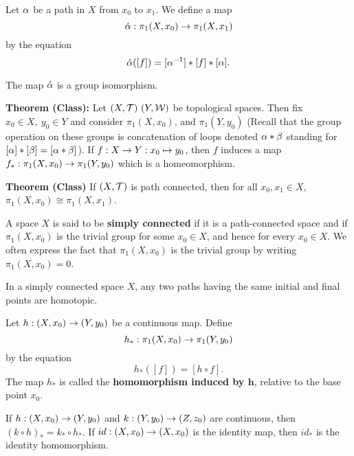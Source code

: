 \vs

\dfn Let $\alpha$ be a path in $X$ from $x_0$ to $x_1$. We define a map
\[\hat {\alpha} :\pi_1(X, x_0)\rightarrow \pi_1(X, x_1)\]
by the equation
\[\hat {\alpha}([f]) = [\alpha^{-1}]*[f]*[\alpha].\]

\vs

\begin{thm}
The map $\hat {\alpha}$ is a group isomorphism.
\end{thm}

\vs

\textbf{Theorem (Class):} Let $(X, \mathcal{T})\ (Y, \mathcal{W})$ be topological spaces. Then fix $x_0\in X,\ y_0\in Y$ and consider $\pi_1(X, x_0)$, and $\pi_1(Y, y_0)$ (Recall that the group operation on these groups is concatenation of loops denoted $\alpha * \beta$  standing for $[\alpha]*[\beta] = [\alpha*\beta]$). If $f:X\rightarrow Y:x_0 \mapsto y_0$, then $f$ induces a map $f_*:\pi_1(X,x_0) \rightarrow \pi_1(Y,y_0)$ which is a homeomorphism.

\vs 

\textbf{Theorem (Class)} If $(X, \mathcal{T})$ is path connected, then for all $x_0, x_1\in X$, $\pi_1(X, x_0)\cong \pi_1(X, x_1)$.

\vs

\dfn A space $X$ is said to be \textbf{simply connected} if it is a path-connected space and if $\pi_1(X, x_0)$ is the trivial group for some $x_0\in X$, and hence for every $x_0\in X$. We often express the fact that $\pi_1(X, x_0)$ is the trivial group by writing $\pi_1(X, x_0) = 0$.

\vs

\begin{lem}
In a simply connected space $X$, any two paths having the same initial and final points are homotopic.
\end{lem}

\vs

\dfn Let $h:(X, x_0) \rightarrow (Y, y_0)$ be a continuous map. Define
\[h_*:\pi_1(X, x_0)\rightarrow \pi_1(Y, y_0)\]
by the equation
\[h_*([f]) = [h\circ f].\]
The map $h_*$ is called the \textbf{homomorphism induced by $\boldsymbol{h}$}, relative to the base point $x_0$.

\vs

\begin{thm}
If $h:(X, x_0)\rightarrow (Y, y_0)$ and $k:(Y, y_0)\rightarrow (Z, z_0)$ are continuous, then $(k\circ h)_* = k_*\circ h_*$. If $id:(X, x_0)\rightarrow (X, x_0)$ is the identity map, then $id_*$ is the identity homomorphism.
\end{thm}

\vs

